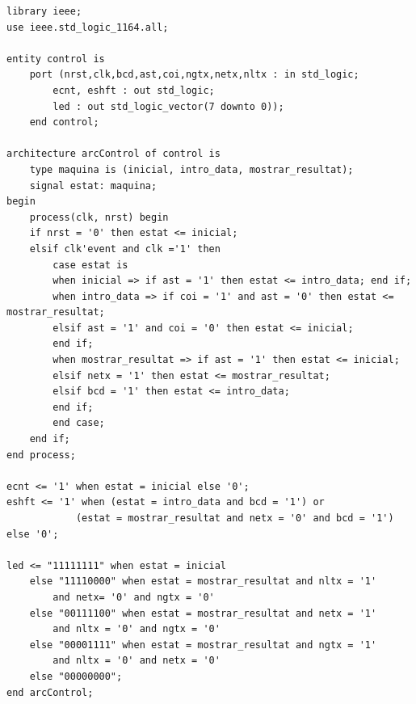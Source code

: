 \documentclass[12pt, a4papre]{article}
\begin{document}
\begin{lstlisting}[style=vhdl, frame=single, basicstyle=\tiny]
library ieee;
use ieee.std_logic_1164.all;

entity control is
	port (nrst,clk,bcd,ast,coi,ngtx,netx,nltx : in std_logic;
		ecnt, eshft : out std_logic;
		led : out std_logic_vector(7 downto 0));
	end control;

architecture arcControl of control is 
	type maquina is (inicial, intro_data, mostrar_resultat);
	signal estat: maquina;
begin
	process(clk, nrst) begin
	if nrst = '0' then estat <= inicial;
	elsif clk'event and clk ='1' then
	    case estat is 
	    when inicial => if ast = '1' then estat <= intro_data; end if;
	    when intro_data => if coi = '1' and ast = '0' then estat <= mostrar_resultat;
		elsif ast = '1' and coi = '0' then estat <= inicial;
		end if;
	    when mostrar_resultat => if ast = '1' then estat <= inicial;
		elsif netx = '1' then estat <= mostrar_resultat;
		elsif bcd = '1' then estat <= intro_data;
		end if;
	    end case;
	end if;
end process;

ecnt <= '1' when estat = inicial else '0';
eshft <= '1' when (estat = intro_data and bcd = '1') or
			(estat = mostrar_resultat and netx = '0' and bcd = '1') else '0';
			
led <= "11111111" when estat = inicial 
    else "11110000" when estat = mostrar_resultat and nltx = '1' 
        and netx= '0' and ngtx = '0'
    else "00111100" when estat = mostrar_resultat and netx = '1' 
    	and nltx = '0' and ngtx = '0'
    else "00001111" when estat = mostrar_resultat and ngtx = '1' 
    	and nltx = '0' and netx = '0'
    else "00000000";
end arcControl;	
\end{lstlisting}
		
		
	
\end{document}
